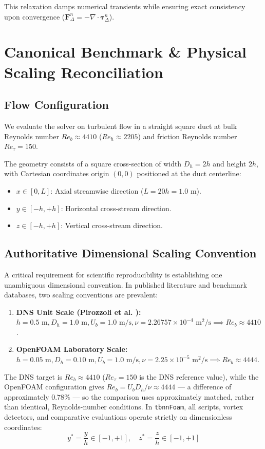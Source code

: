 \documentclass[11pt,a4paper]{article}
\begin{document}
This relaxation damps numerical transients while ensuring exact consistency upon convergence ($\mathbf{F}_\Delta^n = -\nabla \cdot \boldsymbol{\tau}_\Delta^n$).

\section{Canonical Benchmark \& Physical Scaling Reconciliation}

\subsection{Flow Configuration}
We evaluate the solver on turbulent flow in a straight square duct at bulk Reynolds number $Re_b \approx 4410$ ($Re_h \approx 2205$) and friction Reynolds number $Re_\tau = 150$.

The geometry consists of a square cross-section of width $D_h = 2h$ and height $2h$, with Cartesian coordinates origin $(0, 0)$ positioned at the duct centerline:
\begin{itemize}
    \item $x \in [0, L]$: Axial streamwise direction ($L = 20h = 1.0\text{ m}$).
    \item $y \in [-h, +h]$: Horizontal cross-stream direction.
    \item $z \in [-h, +h]$: Vertical cross-stream direction.
\end{itemize}

\subsection{Authoritative Dimensional Scaling Convention}
A critical requirement for scientific reproducibility is establishing one unambiguous dimensional convention. In published literature and benchmark databases, two scaling conventions are prevalent:
\begin{enumerate}
    \item \textbf{DNS Unit Scale (Pirozzoli et al. \cite{pirozzoli2018turbulence}):} $h = 0.5\text{ m}, D_h = 1.0\text{ m}, U_b = 1.0\text{ m/s}, \nu = 2.26757 \times 10^{-4}\text{ m}^2/\text{s} \implies Re_b \approx 4410$.
    \item \textbf{OpenFOAM Laboratory Scale:} $h = 0.05\text{ m}, D_h = 0.10\text{ m}, U_b = 1.0\text{ m/s}, \nu = 2.25 \times 10^{-5}\text{ m}^2/\text{s} \implies Re_b \approx 4444$.
\end{enumerate}

The DNS target is $Re_b \approx 4410$ ($Re_\tau = 150$ is the DNS reference value), while the OpenFOAM configuration gives $Re_b = U_b D_h / \nu \approx 4444$ --- a difference of approximately $0.78\%$ --- so the comparison uses approximately matched, rather than identical, Reynolds-number conditions. In \texttt{tbnnFoam}, all scripts, vortex detectors, and comparative evaluations operate strictly on dimensionless coordinates:
\begin{equation}
y^* = \frac{y}{h} \in [-1, +1], \quad z^* = \frac{z}{h} \in [-1, +1]
\end{equation}
\end{document}
